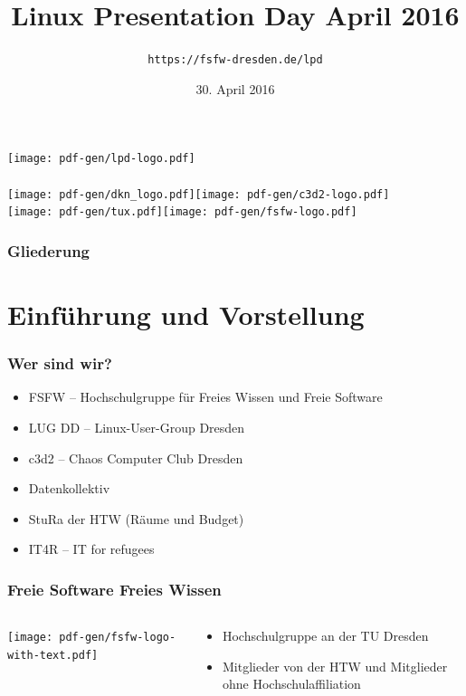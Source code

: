 \documentclass[t]{beamer}
\title{Linux Presentation Day April 2016}
\author{\texttt{https://fsfw-dresden.de/lpd}}
\date[30.04.2016]{30. April 2016}
\begin{document}
\begin{frame}
  \begin{center}%
\texttt{[image: pdf-gen/lpd-logo.pdf]}\\%
\vspace{0.5cm}\\
{\texttt{[image: pdf-gen/dkn\_logo.pdf]}\hspace{0.5cm}\texttt{[image: pdf-gen/c3d2-logo.pdf]}\\\texttt{[image: pdf-gen/tux.pdf]}\hspace{0.5cm}\texttt{[image: pdf-gen/fsfw-logo.pdf]}}
  \end{center}
\end{frame}

\begin{frame}
  \frametitle{Gliederung}
  \tableofcontents
\end{frame}

\section{Einführung und Vorstellung}
\begin{frame}
  \frametitle{Wer sind wir?}
  \begin{itemize}
  \item FSFW – Hochschulgruppe für Freies Wissen und Freie Software
  \item LUG DD – Linux-User-Group Dresden
  \item c3d2 – Chaos Computer Club Dresden
  \item Datenkollektiv
  \item StuRa der HTW (Räume und Budget)
  \item IT4R – IT for refugees
  \end{itemize}
\end{frame}

\begin{frame}
  \frametitle{Freie Software Freies Wissen}
  \begin{columns}
    \begin{column}[T]{0.45\textwidth}
      \texttt{[image: pdf-gen/fsfw-logo-with-text.pdf]}
    \end{column}
    \begin{column}{0.45\textwidth}
      \begin{itemize}
      \item Hochschulgruppe an der TU Dresden
      \item Mitglieder von der HTW und Mitglieder ohne Hochschulaffiliation
      \end{itemize}
    \end{column}
  \end{columns}
\end{frame}
\end{document}
